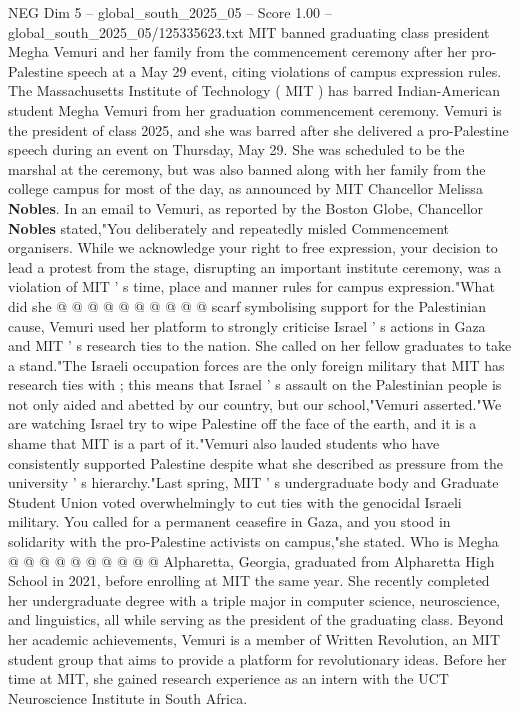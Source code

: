 \begin{textsample}{NEG Dim 5 – global\_south\_2025\_05 – Score 1.00 – global\_south\_2025\_05/125335623.txt}  \label{ex:f5_neg_266}
MIT banned graduating class president Megha Vemuri and her family from the commencement ceremony after her pro-Palestine speech at a May 29 event, citing violations of campus expression rules.
The Massachusetts Institute of Technology ( MIT ) has barred Indian-American student Megha Vemuri from her graduation commencement ceremony.
Vemuri is the president of class 2025, and she was barred after she delivered a pro-Palestine speech during an event on Thursday, May 29.
She was scheduled to be the marshal at the ceremony, but was also banned along with her family from the college campus for most of the day, as announced by MIT Chancellor Melissa \textbf{Nobles}.
In an email to Vemuri, as reported by the Boston Globe, Chancellor \textbf{Nobles} stated,"You deliberately and repeatedly misled Commencement organisers.
While we acknowledge your right to free expression, your decision to lead a protest from the stage, disrupting an important institute ceremony, was a violation of MIT ' s time, place and manner rules for campus expression."What did she @ @ @ @ @ @ @ @ @ @ scarf symbolising support for the Palestinian cause, Vemuri used her platform to strongly criticise Israel ' s actions in Gaza and MIT ' s research ties to the nation.
She called on her fellow graduates to take a stand."The Israeli occupation forces are the only foreign military that MIT has research ties with ; this means that Israel ' s assault on the Palestinian people is not only aided and abetted by our country, but our school,"Vemuri asserted."We are watching Israel try to wipe Palestine off the face of the earth, and it is a shame that MIT is a part of it."Vemuri also lauded students who have consistently supported Palestine despite what she described as pressure from the university ' s hierarchy."Last spring, MIT ' s undergraduate body and Graduate Student Union voted overwhelmingly to cut ties with the genocidal Israeli military.
You called for a permanent ceasefire in Gaza, and you stood in solidarity with the pro-Palestine activists on campus,"she stated.
Who is Megha @ @ @ @ @ @ @ @ @ @ Alpharetta, Georgia, graduated from Alpharetta High School in 2021, before enrolling at MIT the same year.
She recently completed her undergraduate degree with a triple major in computer science, neuroscience, and linguistics, all while serving as the president of the graduating class.
Beyond her academic achievements, Vemuri is a member of Written Revolution, an MIT student group that aims to provide a platform for revolutionary ideas.
Before her time at MIT, she gained research experience as an intern with the UCT Neuroscience Institute in South Africa.

\end{textsample}
